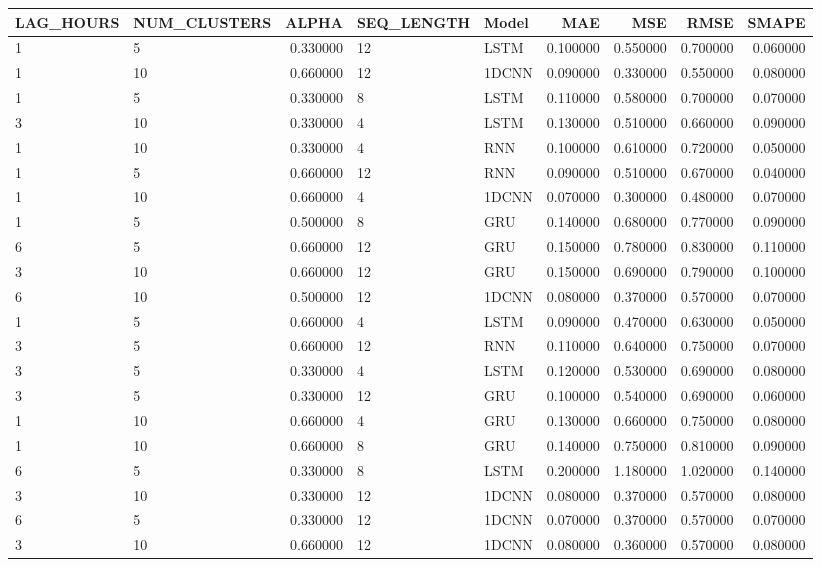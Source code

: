 \begin{tabular}{llrllrrrr}
\toprule
LAG_HOURS & NUM_CLUSTERS & ALPHA & SEQ_LENGTH & Model & MAE & MSE & RMSE & SMAPE \\
\midrule
1 & 5 & 0.330000 & 12 & LSTM & 0.100000 & 0.550000 & 0.700000 & 0.060000 \\
1 & 10 & 0.660000 & 12 & 1DCNN & 0.090000 & 0.330000 & 0.550000 & 0.080000 \\
1 & 5 & 0.330000 & 8 & LSTM & 0.110000 & 0.580000 & 0.700000 & 0.070000 \\
3 & 10 & 0.330000 & 4 & LSTM & 0.130000 & 0.510000 & 0.660000 & 0.090000 \\
1 & 10 & 0.330000 & 4 & RNN & 0.100000 & 0.610000 & 0.720000 & 0.050000 \\
1 & 5 & 0.660000 & 12 & RNN & 0.090000 & 0.510000 & 0.670000 & 0.040000 \\
1 & 10 & 0.660000 & 4 & 1DCNN & 0.070000 & 0.300000 & 0.480000 & 0.070000 \\
1 & 5 & 0.500000 & 8 & GRU & 0.140000 & 0.680000 & 0.770000 & 0.090000 \\
6 & 5 & 0.660000 & 12 & GRU & 0.150000 & 0.780000 & 0.830000 & 0.110000 \\
3 & 10 & 0.660000 & 12 & GRU & 0.150000 & 0.690000 & 0.790000 & 0.100000 \\
6 & 10 & 0.500000 & 12 & 1DCNN & 0.080000 & 0.370000 & 0.570000 & 0.070000 \\
1 & 5 & 0.660000 & 4 & LSTM & 0.090000 & 0.470000 & 0.630000 & 0.050000 \\
3 & 5 & 0.660000 & 12 & RNN & 0.110000 & 0.640000 & 0.750000 & 0.070000 \\
3 & 5 & 0.330000 & 4 & LSTM & 0.120000 & 0.530000 & 0.690000 & 0.080000 \\
3 & 5 & 0.330000 & 12 & GRU & 0.100000 & 0.540000 & 0.690000 & 0.060000 \\
1 & 10 & 0.660000 & 4 & GRU & 0.130000 & 0.660000 & 0.750000 & 0.080000 \\
1 & 10 & 0.660000 & 8 & GRU & 0.140000 & 0.750000 & 0.810000 & 0.090000 \\
6 & 5 & 0.330000 & 8 & LSTM & 0.200000 & 1.180000 & 1.020000 & 0.140000 \\
3 & 10 & 0.330000 & 12 & 1DCNN & 0.080000 & 0.370000 & 0.570000 & 0.080000 \\
6 & 5 & 0.330000 & 12 & 1DCNN & 0.070000 & 0.370000 & 0.570000 & 0.070000 \\
3 & 10 & 0.660000 & 12 & 1DCNN & 0.080000 & 0.360000 & 0.570000 & 0.080000 \\

\end{tabular}
